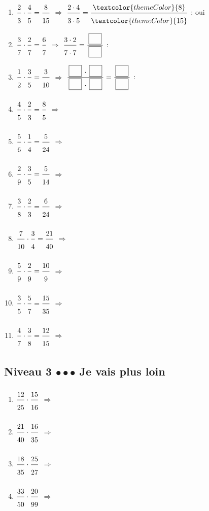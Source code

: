 \begin{enumerate}[leftmargin=*,align=parleft, label=\alph*), itemsep=9pt]
\item $\FA{2}{3}\cdot\FA{4}{5}=\FA{8}{15}$ \quad $\Longrightarrow$ \quad $\FA{2 \cdot 4}{3 \cdot 5}=\FA{\textcolor{themeColor}{8}}{\textcolor{themeColor}{15}}$ \quad : \quad \textcolor{themeColor}{oui}
\item $\FA{3}{7}\cdot\FA{2}{7}=\FA{6}{7}$ \quad $\Longrightarrow$ \quad $\FA{3 \cdot 2}{7 \cdot 7}=\FA{\CaseC}{\CaseC}$ \quad : \quad \Case
\item $\FA{1}{2}\cdot\FA{3}{5}=\FA{3}{10}$ \quad $\Longrightarrow$ \quad $\FA{\CaseC \cdot \CaseC}{\CaseC \cdot \CaseC}=\FA{\CaseC}{\CaseC}$ \quad : \quad \Case
\item $\FA{4}{5}\cdot\FA{2}{3}=\FA{8}{5}$ \quad $\Longrightarrow$
\item $\FA{5}{6}\cdot\FA{1}{4}=\FA{5}{24}$ \quad $\Longrightarrow$
\item $\FA{2}{9}\cdot\FA{3}{5}=\FA{5}{14}$ \quad $\Longrightarrow$
\item $\FA{3}{8}\cdot\FA{2}{3}=\FA{6}{24}$ \quad $\Longrightarrow$
\item $\FA{7}{10}\cdot\FA{3}{4}=\FA{21}{40}$ \quad $\Longrightarrow$
\item $\FA{5}{9}\cdot\FA{2}{9}=\FA{10}{9}$ \quad $\Longrightarrow$
\item $\FA{3}{5}\cdot\FA{5}{7}=\FA{15}{35}$ \quad $\Longrightarrow$
\item $\FA{4}{7}\cdot\FA{3}{8}=\FA{12}{15}$ \quad $\Longrightarrow$
\end{enumerate}
 
\newpage
\subsection{Niveau 3 \quad $\bullet\bullet\bullet$ \quad Je vais plus loin}
 
 
\begin{enumerate}[leftmargin=*,align=parleft, label=\alph*), itemsep=9pt]
\item $\FA{12}{25}\cdot\FA{15}{16}$ \quad $\Longrightarrow$
\item $\FA{21}{40}\cdot\FA{16}{35}$ \quad $\Longrightarrow$
\item $\FA{18}{35}\cdot\FA{25}{27}$ \quad $\Longrightarrow$
\item $\FA{33}{50}\cdot\FA{20}{99}$ \quad $\Longrightarrow$
\end{enumerate}
 
